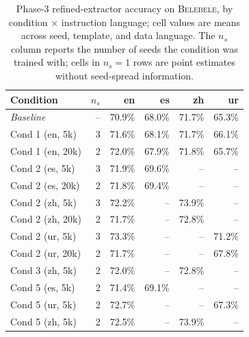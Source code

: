 \begin{table}[t]
  \centering
  \small
  \begin{tabular}{lrrrrr}
    \toprule
    Condition & $n_s$ & en & es & zh & ur \\
    \midrule
    \textit{Baseline} & -- & 70.9\% & 68.0\% & 71.7\% & 65.3\% \\
    Cond 1 (en, 5k) & 3 & 71.6\% & 68.1\% & 71.7\% & 66.1\% \\
    Cond 1 (en, 20k) & 2 & 72.0\% & 67.9\% & 71.8\% & 65.7\% \\
    Cond 2 (es, 5k) & 3 & 71.9\% & 69.6\% & -- & -- \\
    Cond 2 (es, 20k) & 2 & 71.8\% & 69.4\% & -- & -- \\
    Cond 2 (zh, 5k) & 3 & 72.2\% & -- & 73.9\% & -- \\
    Cond 2 (zh, 20k) & 2 & 71.7\% & -- & 72.8\% & -- \\
    Cond 2 (ur, 5k) & 3 & 73.3\% & -- & -- & 71.2\% \\
    Cond 2 (ur, 20k) & 2 & 71.7\% & -- & -- & 67.8\% \\
    Cond 3 (zh, 5k) & 2 & 72.0\% & -- & 72.8\% & -- \\
    Cond 5 (es, 5k) & 2 & 71.4\% & 69.1\% & -- & -- \\
    Cond 5 (ur, 5k) & 2 & 72.7\% & -- & -- & 67.3\% \\
    Cond 5 (zh, 5k) & 2 & 72.5\% & -- & 73.9\% & -- \\
    \bottomrule
  \end{tabular}
  \caption{Phase-3 refined-extractor accuracy on \textsc{Belebele}, by condition $\times$ instruction language; cell values are means across seed, template, and data language. The $n_s$ column reports the number of seeds the condition was trained with; cells in $n_s\!=\!1$ rows are point estimates without seed-spread information.}
  \label{tab:t1-belebele}
\end{table}



